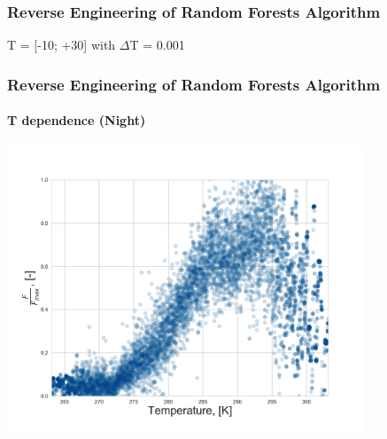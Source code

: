 \documentclass{beamer}
\begin{document}







\begin{frame}
\frametitle{Reverse Engineering of Random Forests Algorithm}
\centering
T = [-10; +30] with $\Delta$T = 0.001


\end{frame}


\begin{frame}
\frametitle{Reverse Engineering of Random Forests Algorithm}
\framesubtitle{T dependence (Night)}
\centering
\includegraphics[width=0.8\textwidth]{T_dependence_all_ENF_With9010_Quartiles.png}\\
\end{frame}
\end{document}
